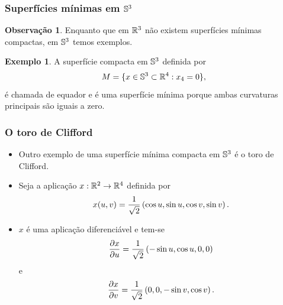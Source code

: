 \documentclass[12pt,a4paper]{beamer}
\theoremstyle{definition}
\newtheorem{definicao}{Definição}
\newtheorem{observacao}{Observação}
\newtheorem{exemplo}{Exemplo}
\begin{document}
\begin{frame}
	\frametitle{Superfícies mínimas em $\mathbb{S}^3$}

	\begin{observacao}
		Enquanto que em $\mathbb R^3$ não existem superfícies mínimas compactas, em $\mathbb{S}^3$ temos exemplos.
	\end{observacao}

	\pause

	\begin{exemplo}
		A superfície compacta em $\mathbb{S}^3$ definida por
		\begin{equation*}
		M = \{ x \in \mathbb{S}^3 \subset \mathbb R^4: x_4 = 0 \},
		\end{equation*}
		é chamada de \alert{equador} e é uma superfície mínima porque ambas curvaturas principais são iguais a zero.
	\end{exemplo}

%	
%		
	 
	
%	
\end{frame}



\begin{frame}
	\frametitle{O toro de Clifford}
	
	\begin{itemize}
		\item Outro exemplo de uma superfície mínima compacta em $\mathbb{S}^3$ é o \alert{toro de Clifford}.
		
		\pause
		
		\item 	Seja a aplicação $x: \mathbb R^2 \rightarrow \mathbb R^4$ definida por
		\begin{equation}\label{def:toro-de-clifford}
		x(u,v) = \frac{1}{\sqrt{2}} \left( \cos u, \sin u, \cos v, \sin v \right).
		\end{equation}
		
		\pause
		
		\item $x$ é uma aplicação diferenciável e tem-se
		\[ \frac{\partial x}{\partial u} = \frac{1}{\sqrt{2}} \left( -\sin u, \cos u, 0, 0 \right) \]
		e
		\[ \frac{\partial x}{\partial v} = \frac{1}{\sqrt{2}} \left( 0,0, -\sin v, \cos v \right). \]
		
		
	\end{itemize}

\end{frame}
\end{document}
